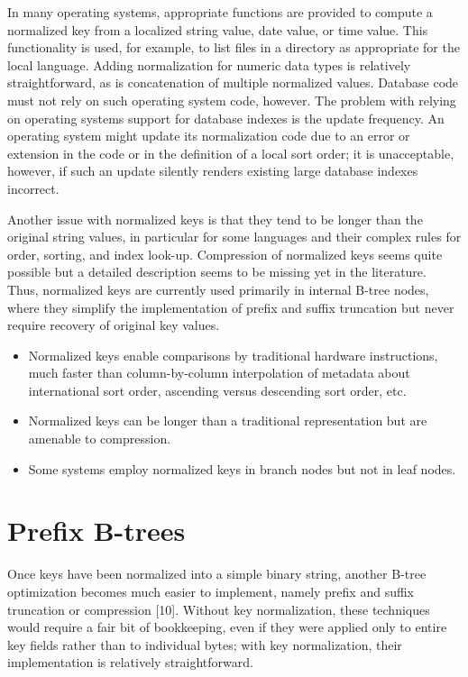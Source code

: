 In many operating systems, appropriate functions are provided to compute
a normalized key from a localized string value, date value, or time
value. This functionality is used, for example, to list files in a
directory as appropriate for the local language. Adding normalization
for numeric data types is relatively straightforward, as is
concatenation of multiple normalized values. Database code must not rely
on such operating system code, however. The problem with relying on
operating systems support for database indexes is the update frequency.
An operating system might update its normalization code due to an error
or extension in the code or in the definition of a local sort order; it
is unacceptable, however, if such an update silently renders existing
large database indexes incorrect.

Another issue with normalized keys is that they tend to be longer than
the original string values, in particular for some languages and their
complex rules for order, sorting, and index look-up. Compression of
normalized keys seems quite possible but a detailed description seems to
be missing yet in the literature. Thus, normalized keys are currently
used primarily in internal B-tree nodes, where they simplify the
implementation of prefix and suffix truncation but never require
recovery of original key values.

\begin{itemize}
\item
  Normalized keys enable comparisons by traditional hardware
  instructions, much faster than column-by-column interpolation of
  metadata about international sort order, ascending versus descending
  sort order, etc.
\item
  Normalized keys can be longer than a traditional representation but
  are amenable to compression.
\item
  Some systems employ normalized keys in branch nodes but not in leaf
  nodes.
\end{itemize}

\hypertarget{prefix-b-trees}{%
\section{Prefix B-trees}\label{prefix-b-trees}}

Once keys have been normalized into a simple binary string, another
B-tree optimization becomes much easier to implement, namely prefix and
suffix truncation or compression {[}10{]}. Without key normalization,
these techniques would require a fair bit of bookkeeping, even if they
were applied only to entire key fields rather than to individual bytes;
with key normalization, their implementation is relatively
straightforward.

